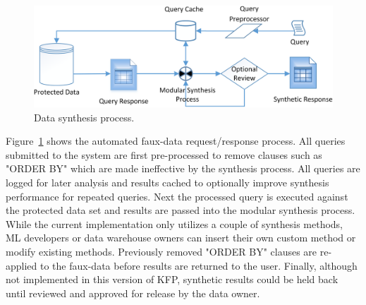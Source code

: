 \documentclass{article}
\begin{document}
\begin{figure}[ht]
  \centering
  \includegraphics[width=120mm]{data_synthesis_process}
  \caption{Data synthesis process.}
  \label{fig:synthesis_process}
\end{figure}

Figure~\ref{fig:synthesis_process} shows the automated faux-data request/response process. All queries submitted to the system are first pre-processed to remove clauses such as "ORDER BY" which are made ineffective by the synthesis process. All queries are logged for later analysis and results cached to optionally improve synthesis performance for repeated queries. Next the processed query is executed against the protected data set and results are passed into the modular synthesis process. While the current implementation only utilizes a couple of synthesis methods, ML developers or data warehouse owners can insert their own custom method or modify existing methods. Previously removed "ORDER BY" clauses are re-applied to the faux-data before results are returned to the user. Finally, although not implemented in this version of KFP, synthetic results could be held back until reviewed and approved for release by the data owner.
\end{document}

